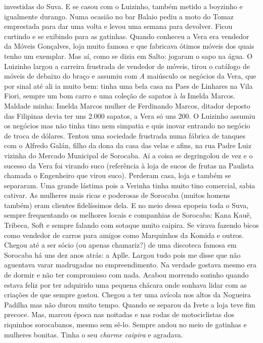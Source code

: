\documentclass[12pt,brazil,]{book}
\begin{document}
investidas do Suva. E se casou com o Luizinho, também metido a boyzinho
e igualmente durango. Numa ocasião no bar Balaio pediu a moto do Tomaz
emprestada para dar uma volta e levou uma semana para devolver. Ficou
curtindo e se exibindo para as gatinhas. Quando conheceu a Vera era
vendedor da Móveis Gonçalves, loja muito famosa e que fabricava ótimos
móveis dos quais tenho um exemplar. Mas aí, como se dizia em Salto:
jogaram o sapo na água. O Luizinho largou a carreira frustrada de
vendedor de móveis, tirou o catálogo de móveis de debaixo do braço e
assumiu com \emph{A} maiúsculo os negócios da Vera, que por sinal até
ali ia muito bem: tinha uma bela casa na Paes de Linhares na Vila Fiori,
sempre um bom carro e uma coleção de sapatos à \emph{la} Imelda Marcos.
Maldade minha: Imelda Marcos mulher de Ferdinando Marcos, ditador
deposto das Filipinas devia ter uns 2.000 sapatos, a Vera só uns 200. O
Luizinho assumiu os negócios mas não tinha tino nem simpatia e quis
inovar entrando no negócio de troca de dólares. Tentou uma sociedade
frustrada numa fábrica de tanques com o Alfredo Galán, filho da dona da
casa das velas e afins, na rua Padre Luiz vizinha do Mercado Municipal
de Sorocaba. Aí a coisa se degringolou de vez e o sucesso da Vera foi
virando suco (referência à loja de sucos de frutas na Paulista chamada o
Engenheiro que virou suco). Perderam casa, loja e também se separaram.
Uma grande lástima pois a Verinha tinha muito tino comercial, sabia
cativar. As mulheres mais ricas e poderosas de Sorocaba (muitos homens
também) eram clientes fidelíssimos dela. E no meio dessa epopeia toda o
Suva, sempre frequentando os melhores locais e companhias de Sorocaba:
Kana Kauê, Tribeca, Soft e sempre falando com sotaque muito caipira. Se
virava fazendo bicos como vendedor de carros para amigos como Marquinhos
da Komida e outros. Chegou até a ser sócio (ou apenas chamariz?) de uma
discoteca famosa em Sorocaba há uns dez anos atrás: a Aplle. Largou tudo
pois me disse que não aguentava varar madrugadas no empreendimento. Na
verdade gostava mesmo era de dormir e não ter compromisso com nada.
Acabou morrendo sozinho quando estava feliz por ter adquirido uma
pequena chácara onde sonhava lidar com as criações de que sempre gostou.
Chegou a ter uma avícola nos altos da Nogueira Padilha mas não durou
muito tempo. Quando se separou da Ivete a loja teve fim precoce. Mas,
marcou época nas noitadas e nas rodas de motociclistas dos riquinhos
sorocabanos, mesmo sem sê-lo. Sempre andou no meio de gatinhas e
mulheres bonitas. Tinha o seu \emph{charme caipira} e agradava.
\end{document}
